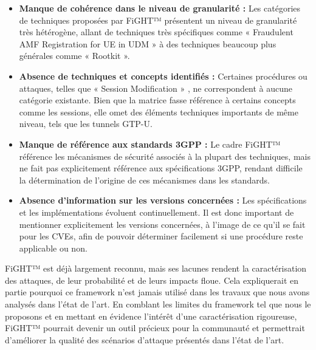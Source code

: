 \documentclass[a4paper,11pt,twoside]{StyleThese}
\begin{document}
\begin{itemize}
    \item \textbf{Manque de cohérence dans le niveau de granularité :} Les catégories de techniques proposées par FiGHT™ présentent un niveau de granularité très hétérogène, allant de techniques très spécifiques comme « Fraudulent AMF Registration for UE in UDM » à des techniques beaucoup plus générales comme « Rootkit ».

    \item \textbf{Absence de techniques et concepts identifiés :} Certaines procédures ou attaques, telles que « Session Modification » \cite{pfcp1}, ne correspondent à aucune catégorie existante. Bien que la matrice fasse référence à certains concepts comme les sessions, elle omet des éléments techniques importants de même niveau, tels que les tunnels GTP-U.
    
    \item \textbf{Manque de référence aux standards 3GPP :} Le cadre FiGHT™ référence les mécanismes de sécurité associés à la plupart des techniques, mais ne fait pas explicitement référence aux spécifications 3GPP, rendant difficile la détermination de l’origine de ces mécanismes dans les standards.
    
    \item \textbf{Absence d'information sur les versions concernées :} Les spécifications et les implémentations évoluent continuellement. Il est donc important de mentionner explicitement les versions concernées, à l’image de ce qu'il se fait pour les CVEs, afin de pouvoir déterminer facilement si une procédure reste applicable ou non.
\end{itemize}

FiGHT™ est déjà largement reconnu, mais ses lacunes rendent la caractérisation des attaques, de leur probabilité et de leurs impacts floue. Cela expliquerait en partie pourquoi ce framework n’est jamais utilisé dans les travaux que nous avons analysés dans l’état de l’art. En comblant les limites du framework tel que nous le proposons et en mettant en évidence l’intérêt d’une caractérisation rigoureuse, FiGHT™ pourrait devenir un outil précieux pour la communauté et permettrait d’améliorer la qualité des scénarios d’attaque présentés dans l’état de l’art.

\end{document}
